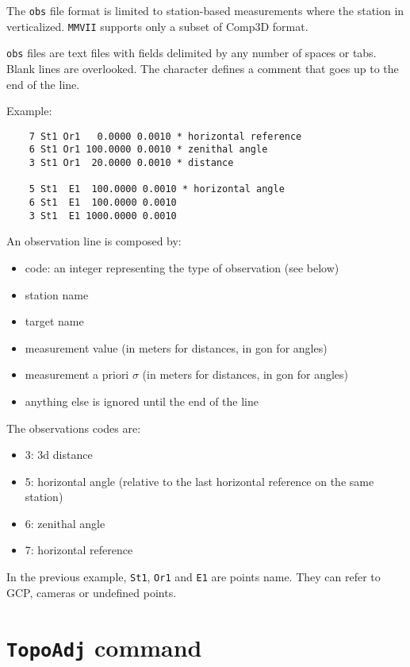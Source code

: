 The {\tt obs} file format is limited to station-based measurements where the station in verticalized.
{\tt MMVII} supports only a subset of Comp3D format.

{\tt obs} files are text files with fields delimited by any number of spaces or tabs. Blank lines are overlooked.
The {\tt *} character defines a comment that goes up to the end of the line.

Example:

\begin{verbatim}
    7 St1 Or1   0.0000 0.0010 * horizontal reference
    6 St1 Or1 100.0000 0.0010 * zenithal angle
    3 St1 Or1  20.0000 0.0010 * distance

    5 St1  E1  100.0000 0.0010 * horizontal angle
    6 St1  E1  100.0000 0.0010
    3 St1  E1 1000.0000 0.0010
\end{verbatim}

An observation line is composed by:

\begin{itemize}
    \item code: an integer representing the type of observation (see below)
    \item station name
    \item target name
    \item measurement value (in meters for distances, in gon for angles)
    \item measurement a priori $\sigma$ (in meters for distances, in gon for angles)
    \item anything else is ignored until the end of the line
\end{itemize}

The observations codes are:

\begin{itemize}
    \item 3: 3d distance
    \item 5: horizontal angle (relative to the last horizontal reference on the same station)
    \item 6: zenithal angle
    \item 7: horizontal reference
\end{itemize}

In the previous example, {\tt St1}, {\tt Or1} and {\tt E1} are points name.
They can refer to GCP, cameras or undefined points.

\section{{\tt TopoAdj} command}

